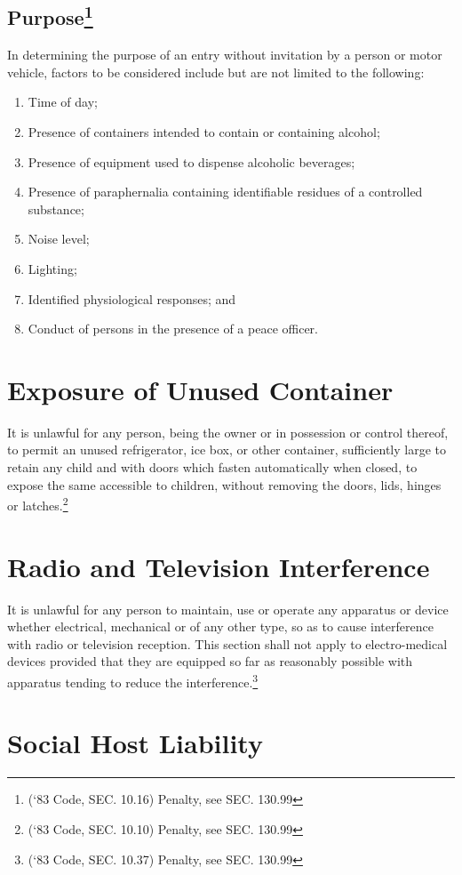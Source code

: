 \subsection{Purpose\footnote{(‘83 Code, SEC. 10.16)  Penalty, see SEC. 130.99}}
In determining the purpose of an entry without invitation by a person or motor vehicle, factors to be considered include but are not limited to the following:
\begin{enumerate}[{\indent}1)]
    \item Time of day; 
    \item Presence of containers intended to contain or containing alcohol; 
    \item Presence of equipment used to dispense alcoholic beverages; 
    \item Presence of paraphernalia containing identifiable residues of a controlled substance; 
    \item Noise level; 
    \item Lighting; 
    \item Identified physiological responses; and 
    \item Conduct of persons in the presence of a peace officer.
\end{enumerate}
\section{Exposure of Unused Container}
It is unlawful for any person, being the owner or in possession or control thereof, to permit an unused refrigerator, ice box, or other container, sufficiently large to retain any child and with doors which fasten automatically when closed, to expose the same accessible to children, without removing the doors, lids, hinges or latches.\footnote{(‘83 Code, SEC. 10.10)  Penalty, see SEC. 130.99}
\section{Radio and Television Interference}
It is unlawful for any person to maintain, use or operate any apparatus or device whether electrical, mechanical or of any other type, so as to cause interference with radio or television reception. This section shall not apply to electro-medical devices provided that they are equipped so far as reasonably possible with apparatus tending to reduce the interference.\footnote{(‘83 Code, SEC. 10.37)  Penalty, see SEC. 130.99}

\section{Social Host Liability}
